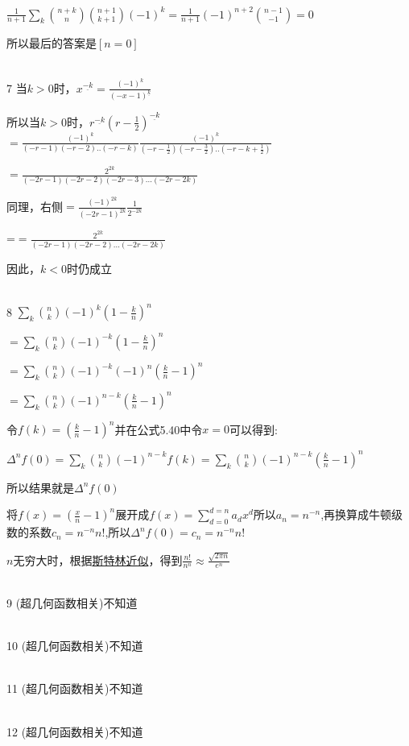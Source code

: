 \documentclass[onecolumn]{article}
\begin{document}
$\frac{1}{n+1}\sum_{k}\binom{n+k}{n}\binom{n+1}{k+1}(-1)^{k}=\frac{1}{n+1}(-1)^{n+2}\binom{n-1}{-1}=0$ \par
所以最后的答案是$[n=0]$ \par
~\\ 
7 当$k>0$时，$x^{\underline{-k}}=\frac{(-1)^{k}}{(-x-1)^{\underline{k}}}$ \par
所以当$k>0$时，$r^{\underline{-k}}(r-\frac{1}{2})^{\underline{-k}}$
$=\frac{(-1)^{k}}{(-r-1)(-r-2)..(-r-k)}\frac{(-1)^{k}}{(-r-\frac{1}{2})(-r-\frac{3}{2})..(-r-k+\frac{1}{2})}$ \par
$=\frac{2^{2k}}{(-2r-1)(-2r-2)(-2r-3)...(-2r-2k)}$ \par
同理，右侧$=\frac{(-1)^{2k}}{(-2r-1)^{2k}}\frac{1}{2^{-2k}}$ \par
=$=\frac{2^{2k}}{(-2r-1)(-2r-2)...(-2r-2k)}$ \par
因此，$k<0$时仍成立 \par
~\\
8 $\sum_{k}\binom{n}{k}(-1)^{k}(1-\frac{k}{n})^{n}$ \par
$=\sum_{k}\binom{n}{k}(-1)^{-k}(1-\frac{k}{n})^{n}$ \par
$=\sum_{k}\binom{n}{k}(-1)^{-k}(-1)^{n}(\frac{k}{n}-1)^{n}$ \par
$=\sum_{k}\binom{n}{k}(-1)^{n-k}(\frac{k}{n}-1)^{n}$ \par
令$f(k)=(\frac{k}{n}-1)^{n}$并在公式5.40中令$x=0$可以得到: \par
$\Delta^{n}f(0)=\sum_{k}\binom{n}{k}(-1)^{n-k}f(k)=\sum_{k}\binom{n}{k}(-1)^{n-k}(\frac{k}{n}-1)^{n}$ \par
所以结果就是$\Delta^{n}f(0)$ \par
将$f(x)=(\frac{x}{n}-1)^{n}$展开成$f(x)=\sum_{d=0}^{d=n}a_{d}x^{d}$所以$a_{n}=n^{-n}$,再换算成牛顿级数的系数$c_{n}=n^{-n}n!$,所以$\Delta^{n}f(0)=c_{n}=n^{-n}n!$ \par
$n$无穷大时，根据\href{https://baike.baidu.com/item/%E6%96%AF%E7%89%B9%E6%9E%97%E5%85%AC%E5%BC%8F/9583086}{斯特林近似}，得到$\frac{n!}{n^{n}}\approx \frac{\sqrt{2 \pi n}}{e^{n}}$ \par
~\\
9 (超几何函数相关)不知道\par
~\\
10 (超几何函数相关)不知道\par
~\\
11 (超几何函数相关)不知道\par
~\\
12 (超几何函数相关)不知道\par
\end{document}
